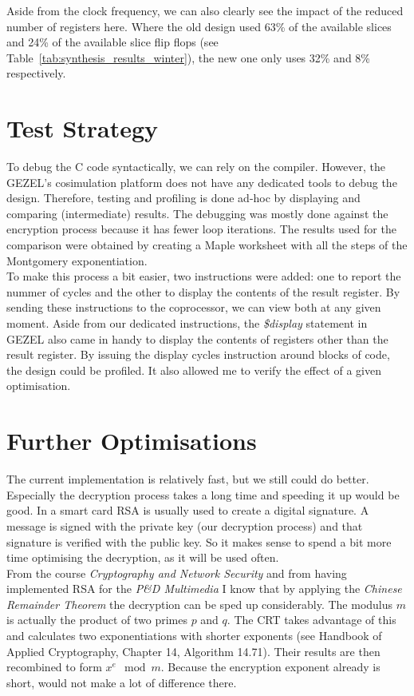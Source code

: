 \documentclass[a4paper]{article}
\begin{document}
Aside from the clock frequency, we can also clearly see the impact of the reduced number of registers here. Where the old design used 63\% of the available slices and 24\% of the available slice flip flops (see Table~\ref{tab:synthesis_results_winter}), the new one only uses 32\% and 8\% respectively.

\section{Test Strategy}

To debug the C code syntactically, we can rely on the compiler. However, the GEZEL's cosimulation platform does not have any dedicated tools to debug the design. Therefore, testing and profiling is done ad-hoc by displaying and comparing (intermediate) results. The debugging was mostly done against the encryption process because it has fewer loop iterations. The results used for the comparison were obtained by creating a Maple worksheet with all the steps of the Montgomery exponentiation.\\


To make this process a bit easier, two instructions were added: one to report the nummer of cycles and the other to display the contents of the result register. By sending these instructions to the coprocessor, we can view both at any given moment. Aside from our dedicated instructions, the \textit{\$display} statement in GEZEL also came in handy to display the contents of registers other than the result register. By issuing the display cycles instruction around blocks of code, the design could be profiled. It also allowed me to verify the effect of a given optimisation.

\section{Further Optimisations}

The current implementation is relatively fast, but we still could do better. Especially the decryption process takes a long time and speeding it up would be good. In a smart card RSA is usually used to create a digital signature. A message is signed with the private key (our decryption process) and that signature is verified with the public key. So it makes sense to spend a bit more time optimising the decryption, as it will be used often.\\

From the course \textit{Cryptography and Network Security} and from having implemented RSA for the \textit{P\&D Multimedia} I know that by applying the \textit{Chinese Remainder Theorem} the decryption can be sped up considerably. The modulus $m$ is actually the product of two primes $p$ and $q$. The CRT takes advantage of this and calculates two exponentiations with shorter exponents (see Handbook of Applied Cryptography, Chapter 14, Algorithm 14.71). Their results are then recombined to form $x^e\mod{m}$. Because the encryption exponent already is short, would not make a lot of difference there.\\
\end{document}
